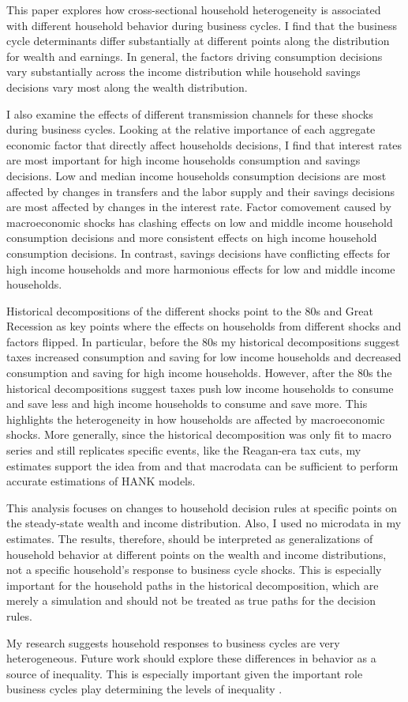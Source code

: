This paper explores how cross-sectional household heterogeneity is associated with different household behavior during business cycles. I find that the business cycle determinants differ substantially at different points along the distribution for wealth and earnings. In general, the factors driving consumption decisions vary substantially across the income distribution while household savings decisions vary most along the wealth distribution.

I also examine the effects of different transmission channels for these shocks during business cycles. Looking at the relative importance of each aggregate economic factor that directly affect households decisions, I find that interest rates are most important for high income households consumption and savings decisions. Low and median income households consumption decisions are most affected by changes in transfers and the labor supply and their savings decisions are most affected by changes in the interest rate. Factor comovement caused by macroeconomic shocks has clashing effects on low and middle income household consumption decisions and more consistent effects on high income household consumption decisions. In contrast, savings decisions have conflicting effects for high income households and more harmonious effects for low and middle income households.

Historical decompositions of the different shocks point to the 80s and Great Recession as key points where the effects on households from different shocks and factors flipped. In particular, before the 80s my historical decompositions suggest taxes increased consumption and saving for low income households and decreased consumption and saving for high income households. However, after the 80s the historical decompositions suggest taxes push low income households to consume and save less and high income households to consume and save more. This highlights the heterogeneity in how households are affected by macroeconomic shocks. More generally, since the historical decomposition was only fit to macro series and still replicates specific events, like the Reagan-era tax cuts, my estimates support the idea from \textcite{bayer2024shocks} and \textcite{iao2024estimating} that macrodata can be sufficient to perform accurate estimations of HANK models.

This analysis focuses on changes to household decision rules at specific points on the steady-state wealth and income distribution. Also, I used no microdata in my estimates. The results, therefore, should be interpreted as generalizations of household behavior at different points on the wealth and income distributions, not a specific household's response to business cycle shocks. This is especially important for the household paths in the historical decomposition, which are merely a simulation and should not be treated as true paths for the decision rules.

My research suggests household responses to business cycles are very heterogeneous. Future work should explore these differences in behavior as a source of inequality. This is especially important given the important role business cycles play determining the levels of inequality \autocite{bayer2024shocks}.
